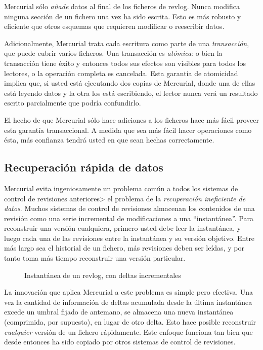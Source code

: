 Mercurial sólo \emph{añade} datos al final de los ficheros de revlog. Nunca
modifica ninguna sección de un fichero una vez ha sido escrita. Esto es más
robusto y eficiente que otros esquemas que requieren modificar o reescribir
datos.

Adicionalmente, Mercurial trata cada escritura como parte de una
\emph{transacción}, que puede cubrir varios ficheros. Una transacción es
\emph{atómica}: o bien la transacción tiene éxito y entonces todos sus efectos
son visibles para todos los lectores, o la operación completa es cancelada.
Esta garantía de atomicidad implica que, si usted está ejecutando dos copias de
Mercurial, donde una de ellas está leyendo datos y la otra los está escribiendo,
el lector nunca verá un resultado escrito parcialmente que podría confundirlo.

El hecho de que Mercurial sólo hace adiciones a los ficheros hace más fácil
proveer esta garantía transaccional. A medida que sea más fácil hacer
operaciones como ésta, más confianza tendrá usted en que sean hechas
correctamente.

\subsection{Recuperación rápida de datos}

Mercurial evita ingeniosamente un problema común a todos los sistemas de control
de revisiones anteriores> el problema de la
\emph{recuperación ineficiente de datos}.
Muchos sistemas de control de revisiones almacenan los contenidos de una
revisión como una serie incremental de modificaciones a una ``instantánea''.
Para reconstruir una versión cualquiera, primero usted debe leer la instantánea,
y luego cada una de las revisiones entre la instantánea y su versión objetivo.
Entre más largo sea el historial de un fichero, más revisiones deben ser leídas,
y por tanto toma más tiempo reconstruir una versión particular.

\begin{figure}[ht]
  \centering
  \caption{Instantánea de un revlog, con deltas incrementales}
  \label{fig:concepts:snapshot}
\end{figure}

La innovación que aplica Mercurial a este problema es simple pero efectiva.
Una vez la cantidad de información de deltas acumulada desde la última
instantánea excede un umbral fijado de antemano, se almacena una nueva
instantánea (comprimida, por supuesto), en lugar de otro delta. Esto hace
posible reconstruir \emph{cualquier} versión de un fichero rápidamente. Este
enfoque funciona tan bien que desde entonces ha sido copiado por otros sistemas
de control de revisiones.

